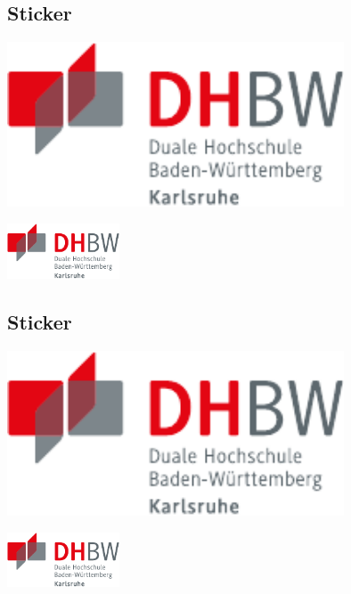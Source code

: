 \subsection{Sticker}
\begin{frame}{\subsecname}

  \begin{sticker}[0]
    \includegraphics[width=0.75\textwidth]{DHBW.pdf}
  \end{sticker}

  \begin{sidesticker}[0]
    \includegraphics[width=0.25\textwidth]{DHBW.pdf}
  \end{sidesticker}

\end{frame}

\subsection{Sticker}
\begin{frame}{\subsecname}

  \begin{sticker}[-1]
    \includegraphics[width=0.75\textwidth]{DHBW.pdf}
  \end{sticker}

  \begin{sidesticker}[+1]
    \includegraphics[width=0.25\textwidth]{DHBW.pdf}
  \end{sidesticker}

\end{frame}
